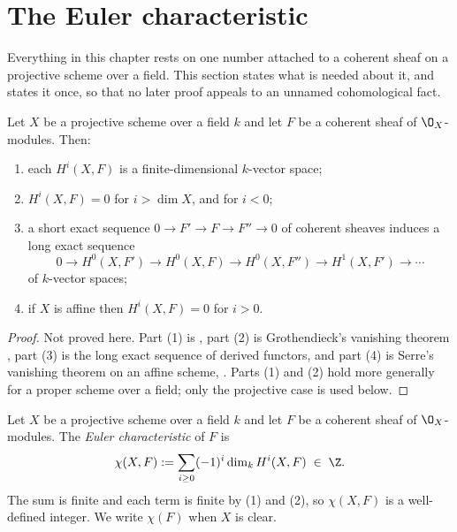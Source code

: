\section{The Euler characteristic}\label{sec:deg-euler}

Everything in this chapter rests on one number attached to a coherent sheaf on
a projective scheme over a field.  This section states what is needed about it,
and states it once, so that no later proof appeals to an unnamed cohomological
fact.

\begin{proposition}
\label{prop:deg-cohomology-finiteness}
Let $X$ be a projective scheme over a field $k$ and let $F$ be a coherent sheaf
of $\O_X$-modules.  Then:
\begin{enumerate}
  \item each $H^i(X,F)$ is a finite-dimensional $k$-vector space;
  \item $H^i(X,F)=0$ for $i>\dim X$, and for $i<0$;
  \item a short exact sequence $0\to F'\to F\to F''\to0$ of coherent sheaves
  induces a long exact sequence
  \[
    0\to H^0(X,F')\to H^0(X,F)\to H^0(X,F'')\to H^1(X,F')\to\cdots
  \]
  of $k$-vector spaces;
  \item if $X$ is affine then $H^i(X,F)=0$ for $i>0$.
\end{enumerate}
\end{proposition}
\begin{proof}
Not proved here.  Part (1) is \cite[III, \S5]{Hartshorne}, part (2) is
Grothendieck's vanishing theorem \cite[III, \S2]{Hartshorne}, part (3)
is the long exact sequence of derived functors, and part (4) is Serre's
vanishing theorem on an affine scheme, \cite[III, \S3]{Hartshorne}.
Parts (1) and (2) hold more generally for a proper scheme over a field; only
the projective case is used below.
\end{proof}

\begin{definition}\label{def:deg-euler}
Let $X$ be a projective scheme over a field $k$ and let $F$ be a coherent sheaf
of $\O_X$-modules.  The \emph{Euler characteristic} of $F$ is
\[
  \chi(X,F):=\sum_{i\geq0}(-1)^i\dim_kH^i(X,F)\;\in\;\Z .
\]
The sum is finite and each term is finite by
(1) and (2), so $\chi(X,F)$ is a
well-defined integer.  We write $\chi(F)$ when $X$ is clear.
\end{definition}

